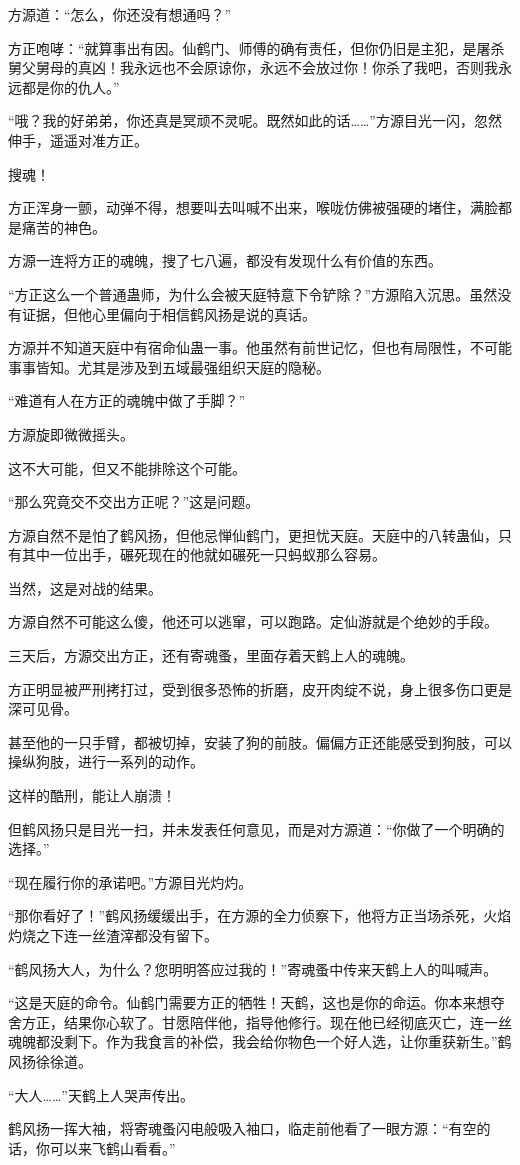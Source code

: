 \begin{this_body}
方源道：“怎么，你还没有想通吗？”

方正咆哮：“就算事出有因。仙鹤门、师傅的确有责任，但你仍旧是主犯，是屠杀舅父舅母的真凶！我永远也不会原谅你，永远不会放过你！你杀了我吧，否则我永远都是你的仇人。”

“哦？我的好弟弟，你还真是冥顽不灵呢。既然如此的话……”方源目光一闪，忽然伸手，遥遥对准方正。

搜魂！

方正浑身一颤，动弹不得，想要叫去叫喊不出来，喉咙仿佛被强硬的堵住，满脸都是痛苦的神色。

方源一连将方正的魂魄，搜了七八遍，都没有发现什么有价值的东西。

“方正这么一个普通蛊师，为什么会被天庭特意下令铲除？”方源陷入沉思。虽然没有证据，但他心里偏向于相信鹤风扬是说的真话。

方源并不知道天庭中有宿命仙蛊一事。他虽然有前世记忆，但也有局限性，不可能事事皆知。尤其是涉及到五域最强组织天庭的隐秘。

“难道有人在方正的魂魄中做了手脚？”

方源旋即微微摇头。

这不大可能，但又不能排除这个可能。

“那么究竟交不交出方正呢？”这是问题。

方源自然不是怕了鹤风扬，但他忌惮仙鹤门，更担忧天庭。天庭中的八转蛊仙，只有其中一位出手，碾死现在的他就如碾死一只蚂蚁那么容易。

当然，这是对战的结果。

方源自然不可能这么傻，他还可以逃窜，可以跑路。定仙游就是个绝妙的手段。

三天后，方源交出方正，还有寄魂蚤，里面存着天鹤上人的魂魄。

方正明显被严刑拷打过，受到很多恐怖的折磨，皮开肉绽不说，身上很多伤口更是深可见骨。

甚至他的一只手臂，都被切掉，安装了狗的前肢。偏偏方正还能感受到狗肢，可以操纵狗肢，进行一系列的动作。

这样的酷刑，能让人崩溃！

但鹤风扬只是目光一扫，并未发表任何意见，而是对方源道：“你做了一个明确的选择。”

“现在履行你的承诺吧。”方源目光灼灼。

“那你看好了！”鹤风扬缓缓出手，在方源的全力侦察下，他将方正当场杀死，火焰灼烧之下连一丝渣滓都没有留下。

“鹤风扬大人，为什么？您明明答应过我的！”寄魂蚤中传来天鹤上人的叫喊声。

“这是天庭的命令。仙鹤门需要方正的牺牲！天鹤，这也是你的命运。你本来想夺舍方正，结果你心软了。甘愿陪伴他，指导他修行。现在他已经彻底灭亡，连一丝魂魄都没剩下。作为我食言的补偿，我会给你物色一个好人选，让你重获新生。”鹤风扬徐徐道。

“大人……”天鹤上人哭声传出。

鹤风扬一挥大袖，将寄魂蚤闪电般吸入袖口，临走前他看了一眼方源：“有空的话，你可以来飞鹤山看看。”

\end{this_body}

